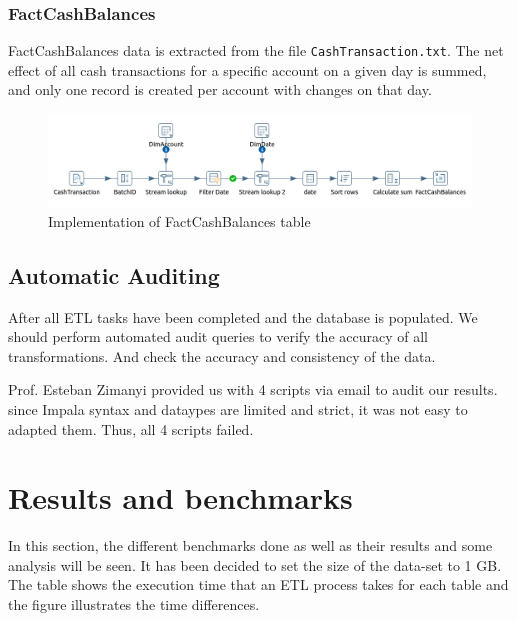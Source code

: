 \documentclass{article}
\newcommand\pcw[1]{\texttt{#1}}
\begin{document}
\subsubsection{FactCashBalances}
FactCashBalances data is extracted from the file \pcw{CashTransaction.txt}. The net effect of all cash transactions for a specific account on a given day is summed, and only one record is created per account with changes on that day. 

\begin{figure}[H] 
\begin{center}
\includegraphics[width=15cm]{images2/balance.png}
\end{center}
\caption{Implementation of FactCashBalances table}
\label{fctBlc}
\end{figure} 



\subsection{Automatic Auditing}
After all ETL tasks have been completed and the database is populated. We should perform automated audit queries to verify the accuracy of all transformations. And check the accuracy and consistency of the data.

Prof. Esteban Zimanyi provided us with 4 scripts via email to audit our results. since Impala syntax and dataypes are limited and strict, it was not easy to adapted them. Thus, all 4 scripts failed.

\section{Results and benchmarks}

In this section, the different benchmarks done as well as their results and some analysis will be seen.
It has been decided to set the size of the  data-set to 1 GB. The table shows the execution time that an ETL process takes for each table and the figure illustrates the time differences.
\end{document}
